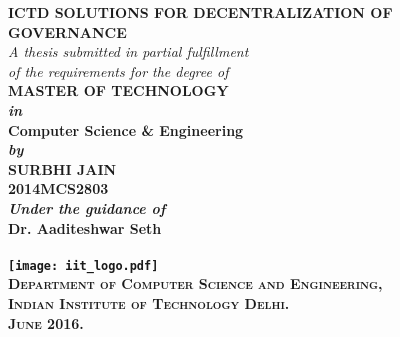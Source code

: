 \begin{titlepage}
\begin{center}

\LARGE{\textsf{\bfseries ICTD SOLUTIONS FOR DECENTRALIZATION OF GOVERNANCE}}\\
\vspace{20pt}
\normalsize
\emph{A thesis submitted in partial fulfillment} \\
\emph{of the requirements for the degree of} \\
\vspace{20pt}
\bfseries MASTER OF TECHNOLOGY \\
\vspace{10pt}
\emph {in}\\
\vspace{10pt}
\bfseries Computer Science \& Engineering \\
\vspace{10pt}
\emph {by}\\
\vspace{10pt}
\Large{\textsf{\bfseries SURBHI JAIN}} \\
{\normalsize \textsf{\bfseries 2014MCS2803}}\\

{\normalsize \emph {Under the guidance of}}
\ \\
\Large{\textsf{\bfseries Dr. Aaditeshwar Seth}} \\
\ \\
\vspace{15pt}
\texttt{[image: iit\_logo.pdf]} \\
\vspace{10pt}
\large{\textsc{Department of Computer Science and Engineering,\\
Indian Institute of Technology Delhi.\\ June 2016.}}
\end{center}
\end{titlepage}
